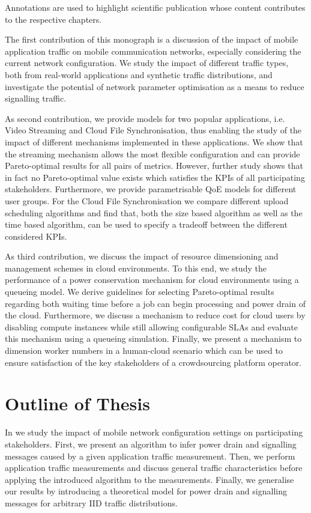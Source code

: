 Annotations are used to highlight scientific publication whose content contributes to the respective chapters.

The first contribution of this monograph is a discussion of the impact of mobile application traffic on mobile communication networks, especially considering the current network configuration.
We study the impact of different traffic types, both from real-world applications and synthetic traffic distributions, and investigate the potential of network parameter optimisation as a means to reduce signalling traffic.

As second contribution, we provide models for two popular applications, i.e. Video Streaming and Cloud File Synchronisation, thus enabling the study of the impact of different mechanisms implemented in these applications.
We show that the streaming mechanism allows the most flexible configuration and can provide Pareto-optimal results for all pairs of metrics.
However, further study shows that in fact no Pareto-optimal value exists which satisfies the \glspl{KPI} of all participating stakeholders.
Furthermore, we provide parametrisable \gls{QoE} models for different user groups.
For the Cloud File Synchronisation we compare different upload scheduling algorithms and find that, both the size based algorithm as well as the time based algorithm, can be used to specify a tradeoff between the different considered \glspl{KPI}.

As third contribution, we discuss the impact of resource dimensioning and management schemes in cloud environments.
To this end, we study the performance of a power conservation mechanism for cloud environments using a queueing model.
We derive guidelines for selecting Pareto-optimal results regarding both waiting time before a job can begin processing and power drain of the cloud.
Furthermore, we discuss a mechanism to reduce cost for cloud users by disabling compute instances while still allowing configurable \glspl{SLA} and evaluate this mechanism using a queueing simulation.
Finally, we present a mechanism to dimension worker numbers in a human-cloud scenario which can be used to ensure satisfaction of the key stakeholders of a crowdsourcing platform operator.

\section{Outline of Thesis}\label{sec:introduction:outline}

In  we study the impact of mobile network configuration settings on participating stakeholders.
First, we present an algorithm to infer power drain and signalling messages caused by a given application traffic measurement.
Then, we perform application traffic measurements and discuss general traffic characteristics before applying the introduced algorithm to the measurements.
Finally, we generalise our results by introducing a theoretical model for power drain and signalling messages for arbitrary \gls{IID} traffic distributions.

